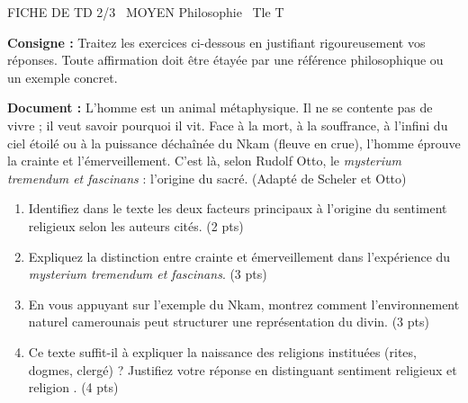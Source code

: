 \documentclass[11pt]{article}
\begin{document}
\begin{tcolorbox}[enhanced,colback=popink,colframe=popink,arc=10pt,boxrule=0pt,left=12pt,right=12pt,top=9pt,bottom=9pt]
{\color{white}\popxbold\small FICHE DE TD 2/3 \textbullet\ MOYEN \hfill Philosophie \textbullet\ Tle T\par}
\end{tcolorbox}
\vspace{4pt}
\textbf{Consigne :} Traitez les exercices ci-dessous en justifiant rigoureusement vos réponses. Toute affirmation doit être étayée par une référence philosophique ou un exemple concret.

\begin{exercice}
\textbf{Document :} \og L'homme est un animal métaphysique. Il ne se contente pas de vivre ; il veut savoir pourquoi il vit. Face à la mort, à la souffrance, à l'infini du ciel étoilé ou à la puissance déchaînée du Nkam (fleuve en crue), l'homme éprouve la crainte et l'émerveillement. C'est là, selon Rudolf Otto, le \textit{mysterium tremendum et fascinans} : l'origine du sacré.\fg{} (Adapté de Scheler et Otto)

\begin{enumerate}
    \item Identifiez dans le texte les deux facteurs principaux à l'origine du sentiment religieux selon les auteurs cités. (2 pts)
    \item Expliquez la distinction entre \og crainte \fg{} et \og émerveillement \fg{} dans l'expérience du \textit{mysterium tremendum et fascinans}. (3 pts)
    \item En vous appuyant sur l'exemple du Nkam, montrez comment l'environnement naturel camerounais peut structurer une représentation du divin. (3 pts)
    \item Ce texte suffit-il à expliquer la naissance des religions instituées (rites, dogmes, clergé) ? Justifiez votre réponse en distinguant \og sentiment religieux \fg{} et \og religion \fg{}. (4 pts)
\end{enumerate}
\end{exercice}
\end{document}
